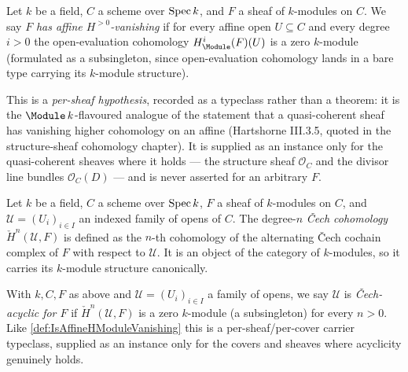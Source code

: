 \begin{definition}
  \label{def:IsAffineHModuleVanishing}

  Let \(k\) be a field, \(C\) a scheme over \(\operatorname{Spec} k\), and \(F\) a sheaf of \(k\)-modules on \(C\). We say \(F\) \emph{has affine \(H^{>0}\)-vanishing} if for every affine open \(U \subseteq C\) and every degree \(i > 0\) the open-evaluation cohomology \(H^i_{\Module}(F)(U)\) is a zero \(k\)-module (formulated as a subsingleton, since open-evaluation cohomology lands in a bare type carrying its \(k\)-module structure).

  This is a \emph{per-sheaf hypothesis}, recorded as a typeclass rather than a theorem: it is the \(\Module\, k\)-flavoured analogue of the statement that a quasi-coherent sheaf has vanishing higher cohomology on an affine (Hartshorne III.3.5, quoted in the structure-sheaf cohomology chapter). It is supplied as an instance only for the quasi-coherent sheaves where it holds --- the structure sheaf \(\mathcal O_C\) and the divisor line bundles \(\mathcal O_C(D)\) --- and is never asserted for an arbitrary \(F\).
\end{definition}

\begin{definition}
  \label{def:Scheme_cechCohomology}

  Let \(k\) be a field, \(C\) a scheme over \(\operatorname{Spec} k\), \(F\) a sheaf of \(k\)-modules on \(C\), and \(\mathcal U = (U_i)_{i \in I}\) an indexed family of opens of \(C\). The degree-\(n\) \emph{\v{C}ech cohomology} \(\check H^n(\mathcal U, F)\) is defined as the \(n\)-th cohomology of the alternating \v{C}ech cochain complex of \(F\) with respect to \(\mathcal U\). It is an object of the category of \(k\)-modules, so it carries its \(k\)-module structure canonically.
\end{definition}

\begin{definition}
  \label{def:IsCechAcyclicCover}

  With \(k, C, F\) as above and \(\mathcal U = (U_i)_{i \in I}\) a family of opens, we say \(\mathcal U\) is \emph{\v{C}ech-acyclic for \(F\)} if \(\check H^n(\mathcal U, F)\) is a zero \(k\)-module (a subsingleton) for every \(n > 0\). Like \cref{def:IsAffineHModuleVanishing} this is a per-sheaf/per-cover carrier typeclass, supplied as an instance only for the covers and sheaves where acyclicity genuinely holds.
\end{definition}

